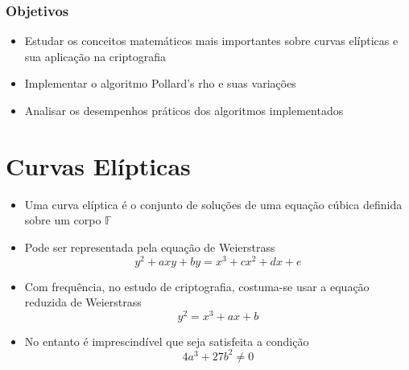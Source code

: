 \documentclass{beamer}
\begin{document}
\begin{frame}
\frametitle{Objetivos}
\begin{itemize}
\item Estudar os conceitos matemáticos mais importantes sobre curvas elípticas e sua aplicação na criptografia
\item Implementar o algoritmo Pollard's rho e suas variações
\item Analisar os desempenhos práticos dos algoritmos implementados
\end{itemize}
\end{frame}

%
%

\section{Curvas Elípticas}
\begin{frame}
\begin{itemize}
\item Uma curva elíptica é o conjunto de soluções de uma equação cúbica definida sobre um corpo $\mathbb{F}$
\item Pode ser representada pela equação de Weierstrass
$$ y^2 + axy + by = x^3 + cx^2 + dx + e$$
\item Com frequência, no estudo de criptografia, costuma-se usar a equação reduzida de Weierstrass
$$ y^2 = x^3 + ax + b $$
\item No entanto é imprescindível que seja satisfeita a condição
$$ 4a^3 + 27b^2 \neq 0$$
\end{itemize}
\end{frame}

%
%

\end{document}
